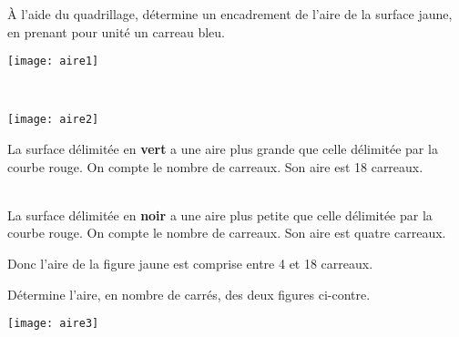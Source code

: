 

\begin{methode*1}

\begin{exemple*1}
\begin{minipage}[c]{0.55\textwidth}
 À l'aide du quadrillage, détermine un encadrement de l'aire de la surface jaune, en prenant pour unité un carreau bleu.
 \end{minipage} \hfill%
 \begin{minipage}[c]{0.2\textwidth}
 \texttt{[image: aire1]}
 \end{minipage} \\
 
 \begin{minipage}[c]{0.1\textwidth}
  \texttt{[image: aire2]}
 \end{minipage} \hfill%
 \begin{minipage}[c]{0.7\textwidth}
La surface délimitée en \textbf{\textcolor{H1}{vert}} a une aire plus grande que celle délimitée par la courbe rouge. On compte le nombre de carreaux. Son aire est 18 carreaux.
 \end{minipage} \\[1em]
La surface délimitée en \textbf{noir} a une aire plus petite que celle délimitée par la courbe rouge. On compte le nombre de carreaux. Son aire est quatre carreaux.

Donc l'aire de la figure jaune est comprise entre 4 et 18 carreaux.

\end{exemple*1}

\exercice 
\begin{minipage}[c]{0.50\textwidth}
 Détermine l'aire, en nombre de carrés, des deux figures ci-contre.
 \end{minipage} \hfill%
 \begin{minipage}[c]{0.16\textwidth}
 \texttt{[image: aire3]}
 \end{minipage} \\
 
\end{methode*1}

